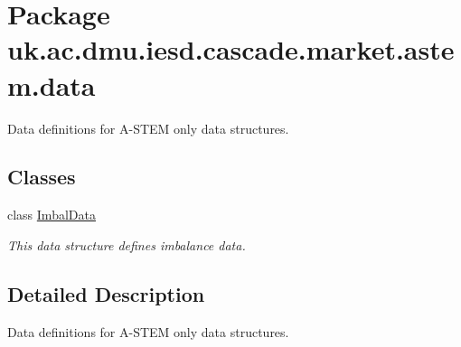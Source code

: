 \hypertarget{namespaceuk_1_1ac_1_1dmu_1_1iesd_1_1cascade_1_1market_1_1astem_1_1data}{\section{Package uk.\-ac.\-dmu.\-iesd.\-cascade.\-market.\-astem.\-data}
\label{namespaceuk_1_1ac_1_1dmu_1_1iesd_1_1cascade_1_1market_1_1astem_1_1data}
}


Data definitions for A-\/\-S\-T\-E\-M only data structures.  


\subsection*{Classes}
\begin{DoxyCompactItemize}
\item 
class \hyperlink{classuk_1_1ac_1_1dmu_1_1iesd_1_1cascade_1_1market_1_1astem_1_1data_1_1_imbal_data}{Imbal\-Data}
\begin{DoxyCompactList}\small\item\em This data structure defines imbalance data. \end{DoxyCompactList}\end{DoxyCompactItemize}


\subsection{Detailed Description}
Data definitions for A-\/\-S\-T\-E\-M only data structures. 